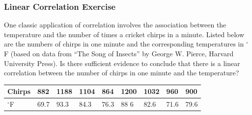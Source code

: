 \documentclass[xcolor=dvipsnames]{beamer}
\begin{document}
\begin{frame}
  \frametitle{Linear Correlation Exercise}
  One classic application of correlation involves the association
  between the temperature and the number of times a cricket chirps in
  a minute. Listed below are the numbers of chirps in one minute and the
  corresponding temperatures in $^{\circ}$F (based on data from ``The Song of
  Insects'' by George W. Pierce, Harvard University Press). Is there
  sufficient evidence to conclude that there is a linear correlation
  between the number of chirps in one minute and the temperature?

\bigskip

\begin{tabular}{|l|l|l|l|l|l|l|l|l|}
\hline
Chirps & 882 & 1188 & 1104 & 864 & 1200 & 1032 & 960 & 900 \\
\hline
$^{\circ}$F & 69.7 & 93.3 & 84.3 & 76.3 & 88 6 & 82.6 & 71.6 & 79.6 \\
\hline
\end{tabular}

\end{frame}



\end{document}
